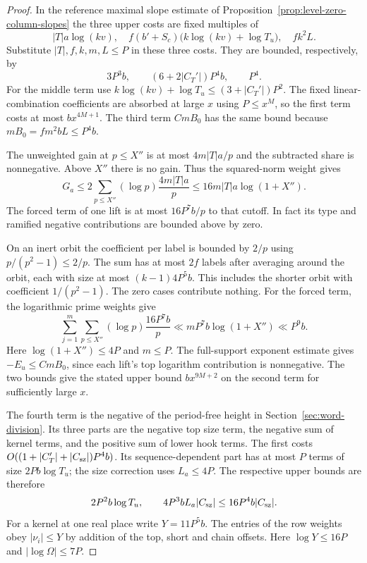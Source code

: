 \begin{proof}
In the reference maximal
slope estimate of Proposition~\ref{prop:level-zero-column-slopes}
the three upper costs are fixed multiples of
\[
 |T|a\log(kv),\quad
 f(b'+S_c)\big(k\log(kv)+\log T_u\big),\quad fk^2 L .
\]
Substitute \(|T|,f,k,m,L\le P\) in these three costs.
They are bounded, respectively, by
\[
 3P^3b,\qquad (6+2|C_T'|)P^4b,\qquad P^4 .
\]
For the middle term use
\(k\log(kv)+\log T_u\le(3+|C_T'|)P^2\).
The fixed linear-combination coefficients are absorbed at
large \(x\) using \(P\le x^M\), so the first term costs at
most \(b x^{4M+1}\). The third term \(CmB_0\) has the
same bound because \(mB_0=fm^2bL\le P^4b\).
\label{cor:frame-height-limit-2}

The unweighted gain at \(p\le X''\) is at most
\(4m|T|a/p\) and the subtracted share is nonnegative.
Above \(X''\) there is no gain. Thus the squared-norm weight
gives
\[
 G_a\le 2\sum_{p\le X''}(\log p)\frac{4m|T|a}{p}
          \le16m|T|a\log(1+X'').
\]
The forced term of one lift is at most \(16P^7 b/p\) to that
cutoff. In fact its type and ramified negative contributions
are bounded above by zero.

On an inert orbit the coefficient
per label is bounded by \(2/p\) using
\(p/(p^2-1)\le2/p\). The sum has at most \(2f\) labels after
averaging around the orbit, each with size at most
\((k-1)4P^5 b\). This includes the shorter orbit with
coefficient \(1/(p^2-1)\). The zero cases contribute nothing.
For the forced term, the logarithmic prime weights give
\[
  \sum_{j=1}^{m}\sum_{p\le X''}(\log p)\frac{16P^7 b}{p}
  \ll m P^7 b\log(1+X'')\ll P^9 b .
\]
Here \(\log(1+X'')\le4P\) and \(m\le P\).
The full-support exponent estimate gives \(-E_u\le CmB_0\),
since each lift's top logarithm contribution is nonnegative.
The two bounds give the stated upper bound \(b x^{9M+2}\)
on the second term for sufficiently large \(x\). \label{cor:frame-height-limit-3}

The fourth term is the negative of the period-free height
in Section~\ref{sec:word-division}. Its three parts are
the negative top size term, the negative sum of kernel
terms, and the positive sum of lower hook terms. The first
costs \(O((1+|C_T'|+|C_{\rm sz}|)P^4b)\). Its sequence-dependent part has at most \(P\) terms of size \(2Pb\log T_u\); the size correction uses \(L_a\le4P\). The respective upper bounds are therefore
\[
 2P^2 b\log T_u,\qquad 4P^3 b L_a|C_{\rm sz}|\le16P^4b|C_{\rm sz}|.
\]
For a kernel at one real place write \(Y=11P^5b\).
The entries of the row weights obey \(|\nu_i|\le Y\)
by addition of the top, short and chain offsets.
Here \(\log Y\le16P\) and \(|\log\Omega|\le7P\).


\end{proof}

